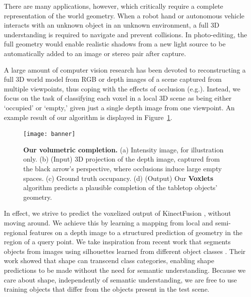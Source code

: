 \documentclass[10pt,twocolumn,letterpaper]{article}
\makeatletter
\renewcommand*{\eg}{e.g.\@\xspace}
\makeatother
\begin{document}
There are many applications, however, which critically require a complete representation of the world geometry.
When a robot hand or autonomous vehicle interacts with an unknown object in an unknown environment, a full 3D understanding is required to navigate and prevent collisions.
In photo-editing, the full geometry would enable realistic shadows from a new light source to be automatically added to an image or stereo pair after capture.

A large amount of computer vision research has been devoted to reconstructing a full 3D world model from RGB or depth images of a scene captured from multiple viewpoints, thus coping with the effects of occlusion  (\eg \cite{seitz2006comparison, izadi-uist-2011}).
Instead, we focus on the task of classifying each voxel in a local 3D scene as being either `occupied' or `empty,' given just a single depth image from one viewpoint.
An example result of our algorithm is displayed in Figure~\ref{fig:intro}.

\begin{figure}
     \texttt{[image: banner]}
         \caption{\textbf{Our volumetric completion.}
    (a) Intensity image, for illustration only.
    (b) (Input) 3D projection of the depth image, captured from the black arrow's perspective, where occlusions induce large empty spaces.
    (c) Ground truth occupancy.
    (d) (Output) Our {\bf Voxlets} algorithm predicts a plausible completion of the tabletop objects' geometry.}%
    \label{fig:intro}
        \vspace{-10pt}
\end{figure}



In effect, we strive to predict the voxelized output of KinectFusion \cite{izadi-uist-2011}, without moving around. %
We achieve this by learning a mapping from local and semi-regional features on a depth image to a structured prediction of geometry in the region of a query point.
We take inspiration from recent work that segments objects from images using silhouettes learned from different object classes \cite{kim-eccv-2012}.
Their work showed that shape can transcend class categories, enabling shape predictions to be made without the need for semantic understanding.
Because we care about shape, independently of semantic understanding, we are free to use training objects that differ from the objects present in the test scene.
\end{document}
